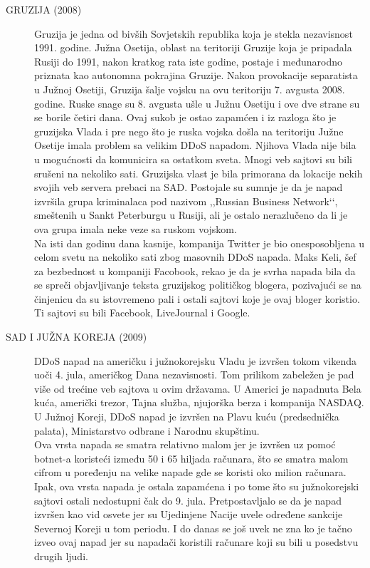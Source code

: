 \documentclass[a4paper]{article}
\theoremstyle{break}
\begin{document}
{\begin{description}
\item [GRUZIJA (2008)] Gruzija je jedna od bivših Sovjetskih republika koja je stekla nezavisnost 1991. godine. Južna Osetija, oblast na teritoriji Gruzije koja je pripadala Rusiji do 1991, nakon kratkog rata iste godine, postaje i međunarodno priznata kao autonomna pokrajina Gruzije. Nakon provokacije separatista u Južnoj Osetiji, Gruzija šalje vojsku na ovu teritoriju 7. avgusta 2008. godine. Ruske snage su 8. avgusta ušle u Južnu Osetiju i ove dve strane su se borile četiri dana. Ovaj sukob je ostao zapamćen i iz razloga što je gruzijska Vlada i pre nego što je ruska vojska došla na teritoriju Južne Osetije imala problem sa velikim DDoS napadom. Njihova Vlada nije bila u mogućnosti da komunicira sa ostatkom sveta. Mnogi veb sajtovi su bili srušeni na nekoliko sati. Gruzijska vlast je bila primorana da lokacije nekih svojih veb servera prebaci na SAD. Postojale su sumnje je da je napad izvršila grupa kriminalaca pod nazivom ,,Russian Business Network‘‘, smeštenih u Sankt Peterburgu u Rusiji, ali je ostalo nerazlučeno da li je ova grupa imala neke veze sa ruskom vojskom.
\\Na isti dan godinu dana kasnije, kompanija Twitter je bio onesposobljena u celom svetu na nekoliko sati zbog masovnih DDoS napada. Maks Keli, šef za bezbednost u kompaniji Facobook, rekao je da je svrha napada bila da se spreči objavljivanje teksta gruzijskog političkog blogera, pozivajući se na činjenicu da su istovremeno pali i ostali sajtovi koje je ovaj bloger koristio. Ti sajtovi su bili Facebook, LiveJournal i Google.     
\item [SAD I JUŽNA KOREJA (2009)] DDoS napad na američku i \linebreak južnokorejsku Vladu je izvršen tokom vikenda uoči 4. jula, američkog Dana nezavisnosti. Tom prilikom zabeležen je pad više od trećine veb sajtova u ovim državama. U Americi je napadnuta Bela kuća, američki trezor, Tajna služba, njujorška berza i kompanija NASDAQ. U Južnoj Koreji, DDoS napad je izvršen na Plavu kuću (predsednička palata), Ministarstvo odbrane i Narodnu skupštinu.
\\Ova vrsta napada se smatra relativno malom jer je izvršen uz pomoć botnet-a koristeći između 50 i 65 hiljada računara, što se smatra malom cifrom u poređenju na velike napade gde se koristi oko milion računara. Ipak, ova vrsta napada je ostala zapamćena i po tome što su južnokorejski sajtovi ostali nedostupni čak do 9. jula. Pretpostavljalo se da je napad izvršen kao vid osvete jer su Ujedinjene Nacije uvele određene sankcije Severnoj Koreji u tom periodu. I do danas se još uvek ne zna ko je tačno izveo ovaj napad jer su napadači koristili računare koji su bili u posedstvu drugih ljudi.    


\end{description}}
\end{document}
